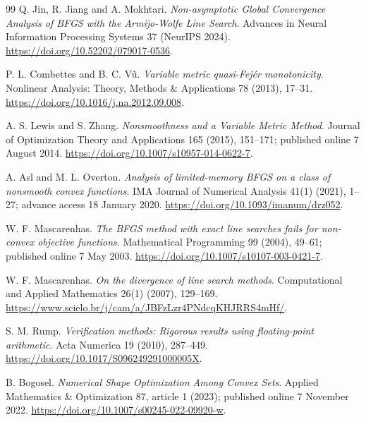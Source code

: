 \begin{thebibliography}{99}
 Q. Jin, R. Jiang and A. Mokhtari. \emph{Non-asymptotic Global Convergence Analysis of BFGS with the Armijo-Wolfe Line Search}. Advances in Neural Information Processing Systems 37 (NeurIPS 2024). \url{https://doi.org/10.52202/079017-0536}.

 P. L. Combettes and B. C. V\~u. \emph{Variable metric quasi-Fej\'er monotonicity}. Nonlinear Analysis: Theory, Methods \& Applications 78 (2013), 17--31. \url{https://doi.org/10.1016/j.na.2012.09.008}.

 A. S. Lewis and S. Zhang. \emph{Nonsmoothness and a Variable Metric Method}. Journal of Optimization Theory and Applications 165 (2015), 151--171; published online 7 August 2014. \url{https://doi.org/10.1007/s10957-014-0622-7}.

 A. Asl and M. L. Overton. \emph{Analysis of limited-memory BFGS on a class of nonsmooth convex functions}. IMA Journal of Numerical Analysis 41(1) (2021), 1--27; advance access 18 January 2020. \url{https://doi.org/10.1093/imanum/drz052}.

 W. F. Mascarenhas. \emph{The BFGS method with exact line searches fails for non-convex objective functions}. Mathematical Programming 99 (2004), 49--61; published online 7 May 2003. \url{https://doi.org/10.1007/s10107-003-0421-7}.

 W. F. Mascarenhas. \emph{On the divergence of line search methods}. Computational and Applied Mathematics 26(1) (2007), 129--169. \url{https://www.scielo.br/j/cam/a/JBFzLzr4PNdcqKHJRRS4mHf/}.

 S. M. Rump. \emph{Verification methods: Rigorous results using floating-point arithmetic}. Acta Numerica 19 (2010), 287--449. \url{https://doi.org/10.1017/S096249291000005X}.

 B. Bogosel. \emph{Numerical Shape Optimization Among Convex Sets}. Applied Mathematics \& Optimization 87, article 1 (2023); published online 7 November 2022. \url{https://doi.org/10.1007/s00245-022-09920-w}.

\end{thebibliography}

